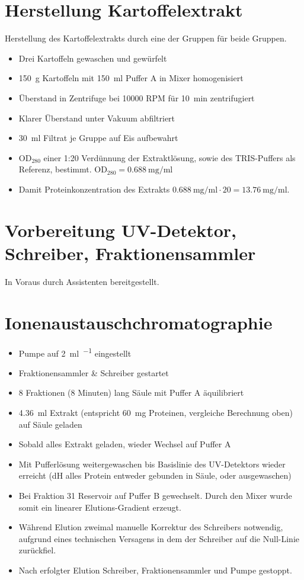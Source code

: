 \documentclass[a4paper,german]{scrreprt}
\begin{document}
\section{Herstellung Kartoffelextrakt}

Herstellung des Kartoffelextrakts durch eine der Gruppen für beide Gruppen.

\begin{itemize}
	\item Drei Kartoffeln gewaschen und gewürfelt
	\item \SI{150}{g} Kartoffeln mit \SI{150}{ml} Puffer A in Mixer homogenisiert
	\item Überstand in Zentrifuge bei 10000 RPM für \SI{10}{min} zentrifugiert
	\item Klarer Überstand unter Vakuum abfiltriert
	\item \SI{30}{ml} Filtrat je Gruppe auf Eis aufbewahrt
	\item $\text{OD}_{280}$ einer 1:20 Verdünnung der Extraktlösung, sowie
		des TRIS-Puffers als Referenz, bestimmt. $\text{OD}_{280} =
		\SI{0.688}{\mg \per \ml}$
	\item Damit Proteinkonzentration des Extrakts $\SI{0.688}{\mg \per \ml}
		\cdot 20 = \SI{13.76}{\mg \per \ml}$.
\end{itemize}

\section{Vorbereitung UV-Detektor, Schreiber, Fraktionensammler}

In Voraus durch Assistenten bereitgestellt.

\section{Ionenaustauschchromatographie}

\begin{itemize}
	\item Pumpe auf \SI{2}{\ml \per \min} eingestellt
	\item Fraktionensammler \& Schreiber gestartet
	\item 8 Fraktionen (8 Minuten) lang Säule mit Puffer A äquilibriert
	\item \SI{4.36}{ml} Extrakt (entspricht \SI{60}{mg} Proteinen,
		vergleiche Berechnung oben) auf Säule geladen
	\item Sobald alles Extrakt geladen, wieder Wechsel auf Puffer A
	\item Mit Pufferlösung weitergewaschen bis Basislinie des UV-Detektors
		wieder erreicht (dH alles Protein entweder gebunden in Säule,
		oder ausgewaschen)
	\item Bei Fraktion 31 Reservoir auf Puffer B gewechselt. Durch den
		Mixer wurde somit ein linearer Elutions-Gradient erzeugt.
	\item Während Elution zweimal manuelle Korrektur des Schreibers
		notwendig, aufgrund eines technischen Versagens in dem der
		Schreiber auf die Null-Linie zurückfiel.
	\item Nach erfolgter Elution Schreiber, Fraktionensammler und Pumpe gestoppt.
\end{itemize}
\end{document}
